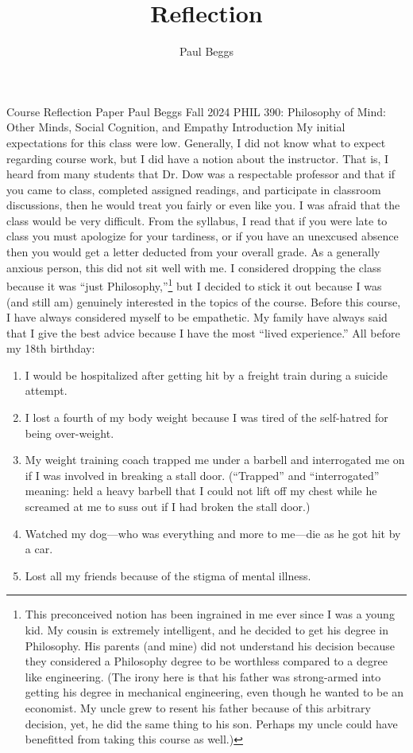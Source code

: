\documentclass[stu]{apa7}
\title{Reflection}
\author{Paul Beggs}
\begin{document}
\maketitle

Course Reflection Paper
Paul Beggs
Fall 2024
PHIL 390: Philosophy of Mind: Other Minds, Social Cognition, and Empathy
Introduction
	My initial expectations for this class were low. Generally, I did not know what to expect regarding course work, but I did have a notion about the instructor. That is, I heard from many students that Dr. Dow was a respectable professor and that if you came to class, completed assigned readings, and participate in classroom discussions, then he would treat you fairly or even like you. 
	I was afraid that the class would be very difficult. From the syllabus, I read that if you were late to class you must apologize for your tardiness, or if you have an unexcused absence then you would get a letter deducted from your overall grade. As a generally anxious person, this did not sit well with me. 
	I considered dropping the class because it was ``just Philosophy,''\footnote{This preconceived notion has been ingrained in me ever since I was a young kid. My cousin is extremely intelligent, and he decided to get his degree in Philosophy. His parents (and mine) did not understand his decision because they considered a Philosophy degree to be worthless compared to a degree like engineering. (The irony here is that his father was strong-armed into getting his degree in mechanical engineering, even though he wanted to be an economist. My uncle grew to resent his father because of this arbitrary decision, yet, he did the same thing to his son. Perhaps my uncle could have benefitted from taking this course as well.)} but I decided to stick it out because I was (and still am) genuinely interested in the topics of the course. 
	Before this course, I have always considered myself to be empathetic. My family have always said that I give the best advice because I have the most ``lived experience.'' All before my 18th birthday:
	\begin{enumerate}
		\item I would be hospitalized after getting hit by a freight train during a suicide attempt.
		\item I lost a fourth of my body weight because I was tired of the self-hatred for being over-weight.
		\item My weight training coach trapped me under a barbell and interrogated me on if I was involved in breaking a stall door. (``Trapped'' and ``interrogated'' meaning: held a heavy barbell that I could not lift off my chest while he screamed at me to suss out if I had broken the stall door.)
		\item Watched my dog---who was everything and more to me---die as he got hit by a car.
		\item Lost all my friends because of the stigma of mental illness. 
	\end{enumerate}
\end{document}
